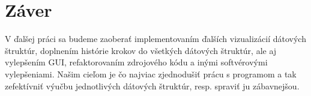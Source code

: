 \section{Záver}
V ďalšej práci sa budeme zaoberať implementovaním ďalších vizualizácií dátových
štruktúr, doplnením histórie krokov do
všetkých dátových štruktúr, ale aj vylepšením GUI, refaktorovaním zdrojového
kódu a inými softvérovými vylepšeniami. Našim cieľom je čo najviac zjednodušiť
prácu s programom a tak zefektívniť výučbu jednotlivých dátových štruktúr, resp.
spraviť ju zábavnejšou.

